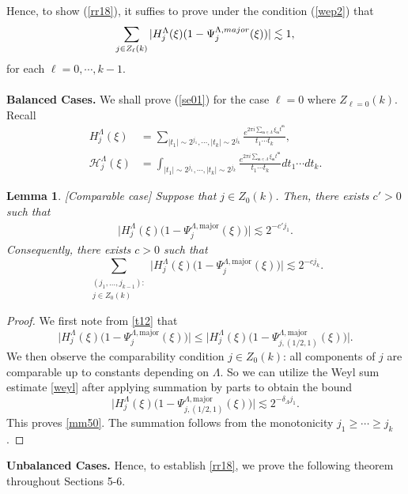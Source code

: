 \documentclass[10pt,a4paper]{amsart}
\newtheorem{lemma}{Lemma}\numberwithin{lemma}{section}
\numberwithin{equation}{section}
\begin{document}
Hence, to show (\ref{rr18}), it suffies to prove  under the  condition (\ref{wep2}) that  
\begin{align}\label{se01}
	\sum_{ j \in Z_{\ell}(k) } |H_j^{\Lambda}(\xi)(1-\Psi^{\Lambda,\rm{major}}_{j}(\xi))| \lesssim 1,
\end{align}
 for each $\ell=0,\cdots,k-1$.\\\\
\textbf{Balanced Cases.}
We  shall  prove (\ref{se01}) for the case $\ell=0$ where $  Z_{\ell=0}(k)$.  Recall
\begin{align*}
	H^{\Lambda}_j(\xi) &=\sum_{|t_1|\sim 2^{j_1},\cdots,|t_k|\sim 2^{j_k}} \frac{e^{2\pi i \sum_{\mathfrak{m}\in \Lambda} \xi_{\mathfrak{m}}t^{\mathfrak{m}} }}{t_1\cdots t_k},\\
	\mathcal{H}^{\Lambda}_j(\xi) &=\int_{|t_1|\sim 2^{j_1},\cdots,|t_k|\sim 2^{j_k}} \frac{e^{2\pi i \sum_{\mathfrak{m}\in \Lambda} \xi_{\mathfrak{m}}t^{\mathfrak{m}} }}{t_1\cdots t_k}dt_1\cdots dt_k.
\end{align*}
\begin{lemma}\label{lemm31}[Comparable case]
Suppose that $j \in Z_0(k)$.
Then, there exists $c'>0$ such that
\begin{align}\label{mm50}
    \bigl| H^{\Lambda}_j(\xi)\bigl(1 - \Psi^{\Lambda,\mathrm{major}}_j(\xi)\bigr) \bigr|
    \lesssim 2^{-c' j_1}.
\end{align}
Consequently, there exists $c>0$ such that 
\[
\sum_{\substack{(j_1,\dots,j_{k-1}): \\ j \in Z_0(k)}}
\bigl| H^{\Lambda}_j(\xi)\bigl(1 - \Psi^{\Lambda,\mathrm{major}}_j(\xi)\bigr) \bigr|
\lesssim 2^{-c j_k}.
\]
\end{lemma}

\begin{proof}
We first note from \eqref{t12} that
\[
\bigl| H^{\Lambda}_j(\xi)\bigl(1 - \Psi^{\Lambda,\mathrm{major}}_j(\xi)\bigr) \bigr|
\le
\bigl| H^{\Lambda}_j(\xi)\bigl(1 - \Psi^{\Lambda,\mathrm{major}}_{j,(1/2,1)}(\xi)\bigr) \bigr|.
\]
We then observe the comparability condition $j \in Z_0(k)$:   all components of $j$ are comparable up to constants depending on $\Lambda$. So we can utilize the Weyl sum estimate \eqref{weyl} after applying summation by parts  to obtain the bound
\[
\bigl| H^{\Lambda}_j(\xi)\bigl(1 - \Psi^{\Lambda,\mathrm{major}}_{j,(1/2,1)}(\xi)\bigr) \bigr|
\lesssim 2^{-\delta_{\Lambda} j_1}.
\]
This proves \eqref{mm50}. The  summation  follows  from the monotonicity $j_1 \ge \cdots \ge j_k$.
\end{proof}
\noindent\textbf{Unbalanced Cases.} Hence, to establish \eqref{rr18}, we prove the following  theorem throughout Sections 5-6.
\end{document}
